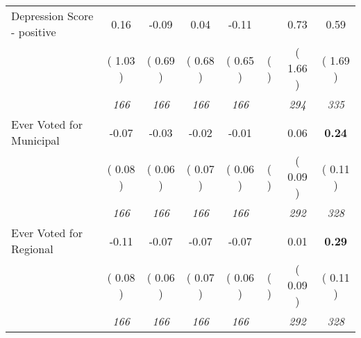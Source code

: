 \begin{tabular}{l c c c c c c c}
Depression Score - positive &      0.16 &     -0.09 &      0.04 &     -0.11 & &      0.73 &      0.59 \\
& (     1.03 ) & (     0.69 ) & (     0.68 ) & (     0.65 ) & ( ) & (     1.66 ) & (     1.69 ) \\
& \textit{ 166 } & \textit{ 166 } & \textit{ 166 } & \textit{ 166 } & & \textit{ 294 } & \textit{ 335 } \\
Ever Voted for Municipal &     -0.07 &     -0.03 &     -0.02 &     -0.01 & &      0.06 & \textbf{      0.24 } \\
& (     0.08 ) & (     0.06 ) & (     0.07 ) & (     0.06 ) & ( ) & (     0.09 ) & (     0.11 ) \\
& \textit{ 166 } & \textit{ 166 } & \textit{ 166 } & \textit{ 166 } & & \textit{ 292 } & \textit{ 328 } \\
Ever Voted for Regional &     -0.11 &     -0.07 &     -0.07 &     -0.07 & &      0.01 & \textbf{      0.29 } \\
& (     0.08 ) & (     0.06 ) & (     0.07 ) & (     0.06 ) & ( ) & (     0.09 ) & (     0.11 ) \\
& \textit{ 166 } & \textit{ 166 } & \textit{ 166 } & \textit{ 166 } & & \textit{ 292 } & \textit{ 328 } \\
\bottomrule
\end{tabular}
